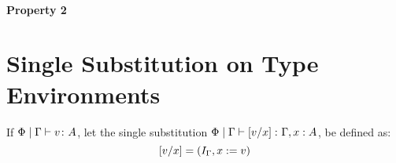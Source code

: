 {\paragraph{Property 2}
\section{Single Substitution on Type Environments}

If $\etyperelation{\P}{\G}{v}{A}$, let the single substitution $\etyperelation{\P}{\G}{\ssub{x}{v}}{\gax}$, be defined as:
\begin{equation}
    \ssub{x}{v} = (I_{\G}, x\setto v)
\end{equation}

}


\ifdefined\NoDocument
\else
\documentclass{report}


    \Substitution

\fi
